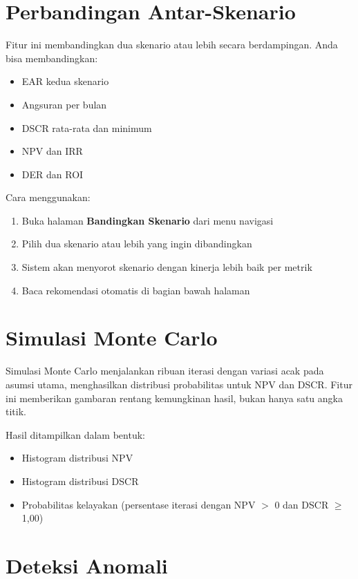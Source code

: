 \documentclass[12pt,a4paper,twoside]{report}
\begin{document}
\section{Perbandingan Antar-Skenario}

Fitur ini membandingkan dua skenario atau lebih secara berdampingan. Anda bisa membandingkan:
\begin{itemize}
  \item EAR kedua skenario
  \item Angsuran per bulan
  \item DSCR rata-rata dan minimum
  \item NPV dan IRR
  \item DER dan ROI
\end{itemize}

Cara menggunakan:
\begin{enumerate}
  \item Buka halaman \textbf{Bandingkan Skenario} dari menu navigasi
  \item Pilih dua skenario atau lebih yang ingin dibandingkan
  \item Sistem akan menyorot skenario dengan kinerja lebih baik per metrik
  \item Baca rekomendasi otomatis di bagian bawah halaman
\end{enumerate}

\section{Simulasi Monte Carlo}

Simulasi Monte Carlo menjalankan ribuan iterasi dengan variasi acak pada asumsi utama, menghasilkan distribusi probabilitas untuk NPV dan DSCR. Fitur ini memberikan gambaran rentang kemungkinan hasil, bukan hanya satu angka titik.

Hasil ditampilkan dalam bentuk:
\begin{itemize}
  \item Histogram distribusi NPV
  \item Histogram distribusi DSCR
  \item Probabilitas kelayakan (persentase iterasi dengan NPV $>$ 0 dan DSCR $\ge$ 1,00)
\end{itemize}

\section{Deteksi Anomali}
\end{document}
